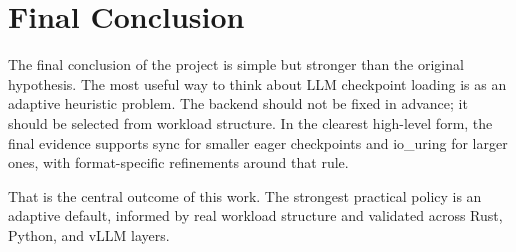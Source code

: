 \section{Final Conclusion}

The final conclusion of the project is simple but stronger than the original hypothesis. The most useful way to think about LLM checkpoint loading is as an adaptive heuristic problem. The backend should not be fixed in advance; it should be selected from workload structure. In the clearest high-level form, the final evidence supports sync for smaller eager checkpoints and io\_uring for larger ones, with format-specific refinements around that rule.

That is the central outcome of this work. The strongest practical policy is an adaptive default, informed by real workload structure and validated across Rust, Python, and vLLM layers.
